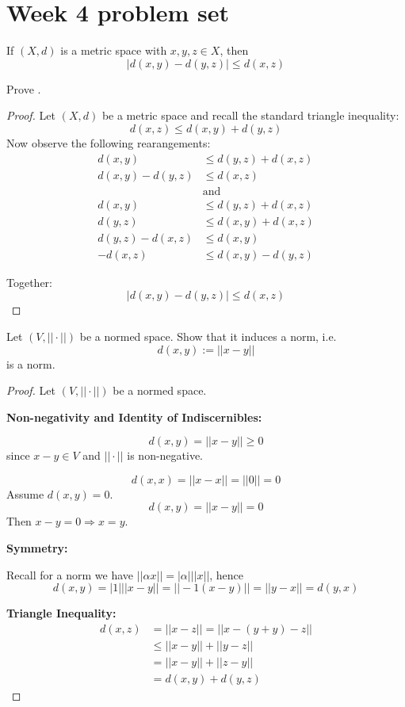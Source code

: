 \newpage 
\section{Week 4 problem set}
\begin{prop}
    \label{prop:reverse_triangle}
    If $(X,d)$ is a metric space with $x,y,z \in X$, then 
    \[
        |d(x,y) - d(y,z)| \leq d(x,z)
    \]
\end{prop}
\begin{prob}
    Prove . 
\end{prob}
\begin{proof}
    Let $(X,d)$ be a metric space and recall the standard 
    triangle inequality: 
    \[
        d(x,z) \leq d(x,y) + d(y,z)
    \]
    Now observe the following rearangements: 
    \begin{align*}
        d(x,y) &\leq d(y,z) + d(x,z) \\ 
        d(x,y) - d(y,z) &\leq d(x,z) \\ 
                        &\text{and} \\ 
        d(x,y) &\leq d(y,z) + d(x,z) \\ 
        d(y,z) &\leq d(x,y) + d(x,z) \\ 
        d(y,z) - d(x,z) &\leq d(x,y) \\ 
        -d(x,z) &\leq d(x,y) - d(y,z) 
    \end{align*}

    Together: 
    \[
        |d(x,y) - d(y,z)| \leq d(x,z)
    \]
\end{proof}
\begin{prob}[3.1.6 Spaces]
    Let $(V,||\cdot||)$ be a normed space. Show that 
    it induces a norm, i.e. 
    \[
        d(x,y) := ||x-y||
    \]
    is a norm.
\end{prob}
\begin{proof}
    Let $(V,||\cdot||)$ be a normed space. 

    \textbf{Non-negativity and Identity of Indiscernibles:}

    \[
        d(x,y) = ||x-y|| \geq 0 
    \]
    since $x-y \in V$ and $||\cdot||$ is non-negative. 
    
    \[
        d(x,x) = ||x-x|| = ||0|| = 0
    \]
    Assume $d(x,y) = 0$. 
    \[
        d(x,y) = ||x-y|| = 0
    \]
    Then $x-y = 0 \Rightarrow x = y$.

    \textbf{Symmetry:}

    Recall for a norm we have $||\alpha x|| = |\alpha| ||x||$, 
    hence 
    \[
        d(x,y) = |1|||x-y|| = ||-1(x-y)|| = ||y-x|| = d(y,x)
    \]

    \textbf{Triangle Inequality:}
    \begin{align*}
        d(x,z) &= ||x-z|| = ||x - (y + y) - z|| \\ 
               &\leq ||x-y|| + ||y - z|| \\ 
               &= ||x-y|| + ||z-y|| \\ 
               &= d(x,y) + d(y,z)
    \end{align*}
\end{proof}

